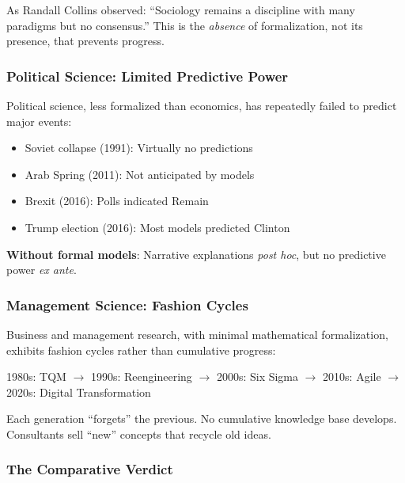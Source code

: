 As Randall Collins observed: ``Sociology remains a discipline with many paradigms
but no consensus.'' This is the \textit{absence} of formalization, not its
presence, that prevents progress.

\subsubsection{Political Science: Limited Predictive Power}

Political science, less formalized than economics, has repeatedly failed to
predict major events:
\begin{itemize}[nosep]
    \item Soviet collapse (1991): Virtually no predictions
    \item Arab Spring (2011): Not anticipated by models
    \item Brexit (2016): Polls indicated Remain
    \item Trump election (2016): Most models predicted Clinton
\end{itemize}

\textbf{Without formal models}: Narrative explanations \textit{post hoc},
but no predictive power \textit{ex ante}.

\subsubsection{Management Science: Fashion Cycles}

Business and management research, with minimal mathematical formalization,
exhibits fashion cycles rather than cumulative progress:
\begin{center}
1980s: TQM $\to$ 1990s: Reengineering $\to$ 2000s: Six Sigma $\to$
2010s: Agile $\to$ 2020s: Digital Transformation
\end{center}

Each generation ``forgets'' the previous. No cumulative knowledge base develops.
Consultants sell ``new'' concepts that recycle old ideas.

\subsubsection{The Comparative Verdict}

